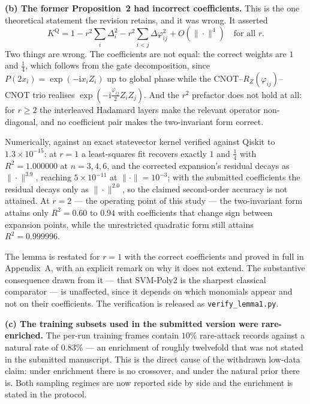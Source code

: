 \documentclass[11pt,a4paper]{article}
\begin{document}
\textbf{(b) The former Proposition~2 had incorrect coefficients.} This is the
one theoretical statement the revision retains, and it was wrong. It asserted
\[
  K^{\mathrm{Q}} = 1 - r^{2}\!\sum_i\Delta_i^2
  - r^{2}\!\!\sum_{i<j}\!\Delta\varphi_{ij}^2 + O(\|\cdot\|^4)
  \quad\text{for all } r .
\]
Two things are wrong. The coefficients are not equal: the correct weights are
$1$ and $\tfrac14$, which follows from the gate decomposition, since
$P(2x_i)=\exp(-\mathrm{i}x_iZ_i)$ up to global phase while the
CNOT--$R_Z(\varphi_{ij})$--CNOT trio realises
$\exp(-\mathrm{i}\tfrac{\varphi_{ij}}{2}Z_iZ_j)$. And the $r^{2}$ prefactor does
not hold at all: for $r\ge2$ the interleaved Hadamard layers make the relevant
operator non-diagonal, and no coefficient pair makes the two-invariant form
correct.

Numerically, against an exact statevector kernel verified against Qiskit to
$1.3\times10^{-15}$: at $r=1$ a least-squares fit recovers exactly $1$ and
$\tfrac14$ with $R^2=1.000000$ at $n=3,4,6$, and the corrected expansion's
residual decays as $\|\cdot\|^{3.9}$, reaching $5\times10^{-11}$ at
$\|\cdot\|=10^{-3}$; with the submitted coefficients the residual decays only as
$\|\cdot\|^{2.0}$, so the claimed second-order accuracy is not attained. At
$r=2$ --- the operating point of this study --- the two-invariant form attains
only $R^2=0.60$ to $0.94$ with coefficients that change sign between expansion
points, while the unrestricted quadratic form still attains $R^2=0.999996$.

The lemma is restated for $r=1$ with the correct coefficients and proved in full
in Appendix~A, with an explicit remark on why it does not extend. The
substantive consequence drawn from it --- that SVM-Poly2 is the sharpest
classical comparator --- is unaffected, since it depends on which monomials
appear and not on their coefficients. The verification is released as
\texttt{verify\_lemma1.py}.

\textbf{(c) The training subsets used in the submitted version were
rare-enriched.} The per-run training frames contain $10\%$ rare-attack records
against a natural rate of $0.83\%$ --- an enrichment of roughly twelvefold that
was not stated in the submitted manuscript. This is the direct cause of the
withdrawn low-data claim: under enrichment there is no crossover, and under the
natural prior there is. Both sampling regimes are now reported side by side and
the enrichment is stated in the protocol.

\end{document}
